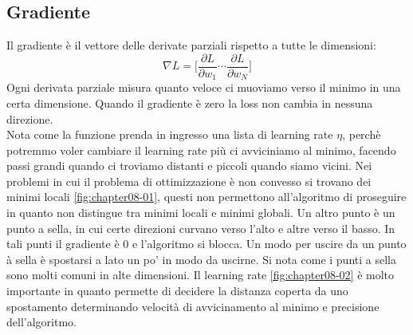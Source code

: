 	\subsection{Gradiente}
	Il gradiente \`e il vettore delle derivate parziali rispetto a tutte le dimensioni:
	$$\nabla L = \biggl[\dfrac{\partial L}{\partial w_1}\cdots\dfrac{\partial L}{\partial w_N}\biggr]$$
	Ogni derivata parziale misura quanto veloce ci muoviamo verso il minimo in una certa dimensione.
	Quando il gradiente \`e zero la loss non cambia in nessuna direzione.\\
	
	Nota come la funzione prenda in ingresso una lista di learning rate $\eta$, perch\`e potremmo voler cambiare il learning rate pi\`u ci avviciniamo al minimo, facendo passi grandi quando ci troviamo distanti e piccoli quando siamo vicini.
	Nei problemi in cui il problema di ottimizzazione \`e non convesso si trovano dei minimi locali \ref{fig:chapter08-01}, questi non permettono all'algoritmo di proseguire in quanto non distingue tra minimi locali e minimi globali.
	Un altro punto \`e un punto a sella, in cui certe direzioni curvano verso l'alto e altre verso il basso.
	In tali punti il gradiente \`e $0$ e l'algoritmo si blocca.
	Un modo per uscire da un punto \`a sella \`e spostarsi a lato un po' in modo da uscirne.
	Si nota come i punti a sella sono molti comuni in alte dimensioni.
	Il learning rate \ref{fig:chapter08-02} \`e molto importante in quanto permette di decidere la distanza coperta da uno spostamento determinando velocit\`a di avvicinamento al minimo e precisione dell'algoritmo.
	
